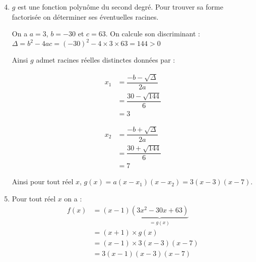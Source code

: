 \documentclass[15pt, mathserif]{beamer}
\begin{document}
 \begin{frame} 
 \begin{enumerate} 
 \setcounter{enumi}{3} 
 	\item $g$ est une fonction polynôme du second degré. Pour trouver sa forme factorisée on déterminer ses éventuelles racines.
 
 On a $a=3$, $b=-30$ et $c=63$. On calcule son discriminant : \hfil $\Delta=b^2-4ac= \left(-30\right)^2 -4 \times 3 \times 63= 144 >0$ 
 
 Ainsi $g$ admet racines réelles distinctes données par : \begin{minipage}{0.45\linewidth} 
 \begin{align*} 
 x_1 &= \dfrac{-b-\sqrt{\Delta}}{2a} \\ 
 &= \dfrac{30-\sqrt{144}}{6} \\ 
 &= 3\end{align*} 
 \end{minipage} 
 \hfil \begin{minipage}{0.45\linewidth} 
 \begin{align*}x_2 &= \dfrac{-b+\sqrt{\Delta}}{2a} \\ 
 &= \dfrac{30+\sqrt{144}}{6} \\ 
 &= 7
 \end{align*} 
 \end{minipage} 
 
 Ainsi pour tout réel $x$, $g(x)=a(x-x_1)(x-x_2)= 3\left(x-3\right)\left(x-7 \right)$. 
 \end{enumerate}
 \end{frame} 
 \begin{frame} 
 \begin{enumerate} 
 \setcounter{enumi}{4} 
 	 \item Pour tout réel $x$ on a :
 \begin{align*} 
 f(x)&=(x-1)\underbrace{(3x^2-30x+63)}_{=g(x)} \\ 
   &= (x+1) \times g(x) \\ 
  &= (x-1) \times 3\left(x-3\right)\left(x-7 \right) \\ 
 &= 3(x-1)\left(x-3\right)\left(x-7 \right)
   \end{align*}
 \end{enumerate} 
 
 \end{frame}
\end{document}
